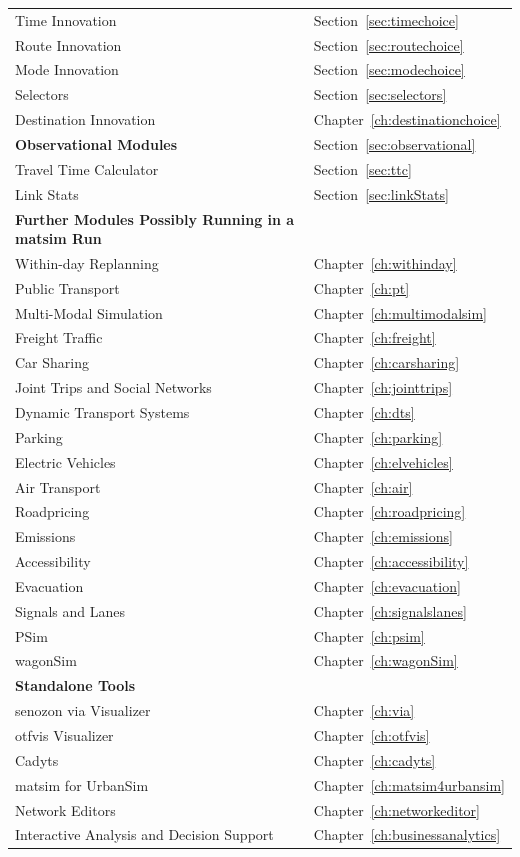 \begin{center}
\begin{longtable}{|l|l|}
	\hline
	Time Innovation & Section~\ref{sec:timechoice} \\
	Route Innovation & Section~\ref{sec:routechoice} \\
	Mode Innovation & Section~\ref{sec:modechoice} \\
	Selectors & Section~\ref{sec:selectors} \\
	Destination Innovation & Chapter~\ref{ch:destinationchoice} \\
	\hline
	\textbf{Observational Modules} & Section~\ref{sec:observational} \\
	\hline
	Travel Time Calculator & Section~\ref{sec:ttc} \\
	Link Stats & Section~\ref{sec:linkStats} \\
	\hline
	\textbf{Further Modules Possibly Running in a \gls{matsim} Run} & \\
	\hline
	Within-day Replanning & Chapter~\ref{ch:withinday} \\
	Public Transport & Chapter~\ref{ch:pt} \\
	Multi-Modal Simulation & Chapter~\ref{ch:multimodalsim} \\
	Freight Traffic & Chapter~\ref{ch:freight} \\
	Car Sharing & Chapter~\ref{ch:carsharing} \\
	Joint Trips and Social Networks & Chapter~\ref{ch:jointtrips} \\
	Dynamic Transport Systems & Chapter~\ref{ch:dts} \\
	Parking & Chapter~\ref{ch:parking} \\
	Electric Vehicles & Chapter~\ref{ch:elvehicles} \\
	Air Transport & Chapter~\ref{ch:air} \\
	Roadpricing & Chapter~\ref{ch:roadpricing} \\
	Emissions & Chapter~\ref{ch:emissions} \\
	Accessibility & Chapter~\ref{ch:accessibility} \\
	Evacuation & Chapter~\ref{ch:evacuation}  \\
	Signals and Lanes & Chapter~\ref{ch:signalslanes} \\
	PSim & Chapter~\ref{ch:psim} \\
	wagonSim & Chapter~\ref{ch:wagonSim} \\
	\hline
	\textbf{Standalone Tools} & \\ %
	\hline
	\gls{senozon} \gls{via} Visualizer & Chapter~\ref{ch:via} \\
	\gls{otfvis} Visualizer & Chapter~\ref{ch:otfvis} \\
	Cadyts & Chapter~\ref{ch:cadyts} \\
	\gls{matsim} for UrbanSim & Chapter~\ref{ch:matsim4urbansim} \\	
	Network Editors &  Chapter~\ref{ch:networkeditor} \\
	Interactive Analysis and Decision Support & Chapter~\ref{ch:businessanalytics} \\
\end{longtable}
\end{center}

